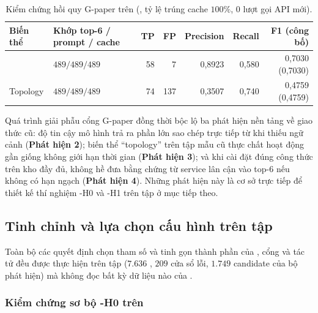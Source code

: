 \begin{table}[H]
  \centering
  \caption[Kết quả kiểm chứng hồi quy G-paper trên tập đối chiếu]{Kiểm chứng hồi quy G-paper trên  (, tỷ lệ trúng cache $100\%$, $0$ lượt gọi API mới).}
  \label{tab:ch5-gpaper}
  \tblfont
  \tblsetup
  \setlength{\tabcolsep}{4pt}
  \begin{tabularx}{\linewidth}{|l|Y|r|r|r|r|r|}
    \hline
    \textbf{Biến thể} & \textbf{Khớp top-6 / prompt / cache} & \textbf{TP} & \textbf{FP} & \textbf{Precision} & \textbf{Recall} & \textbf{F1 (công bố)} \\
    \hline
     & $489/489/489$ & 58 & 7 & 0,8923 & 0,580 & 0,7030 (0,7030) \\
    \hline
    Topology & $489/489/489$ & 74 & 137 & 0,3507 & 0,740 & 0,4759 (0,4759) \\
    \hline
  \end{tabularx}
\end{table}

Quá trình giải phẫu cổng G-paper đồng thời bộc lộ ba phát hiện nền tảng về giao thức cũ: độ tin cậy mô hình trả ra phần lớn sao chép trực tiếp từ  khi thiếu ngữ cảnh (\textbf{Phát hiện 2}); biến thể ``topology'' trên tập mẫu cũ thực chất hoạt động gần giống  không giới hạn thời gian (\textbf{Phát hiện 3}); và khi cài đặt đúng công thức  trên kho đầy đủ,  không hề đưa bằng chứng từ service lân cận vào top-6 nếu không có hạn ngạch (\textbf{Phát hiện 4}). Những phát hiện này là cơ sở trực tiếp để thiết kế thí nghiệm \hyp{H0} và \hyp{H1} trên tập  ở mục tiếp theo.

\subsection{Tinh chỉnh và lựa chọn cấu hình trên tập }
\label{sec:ch5-val}

Toàn bộ các quyết định chọn tham số và tinh gọn thành phần của \CTAV{}, cổng  và tác tử  đều được thực hiện trên tập  ($7.636$ , $209$ cửa sổ lỗi, $1.749$ candidate của bộ phát hiện) mà không đọc bất kỳ dữ liệu nào của .

\subsubsection{Kiểm chứng sơ bộ \hyp{H0} trên }
\label{sec:ch5-val-h0}

